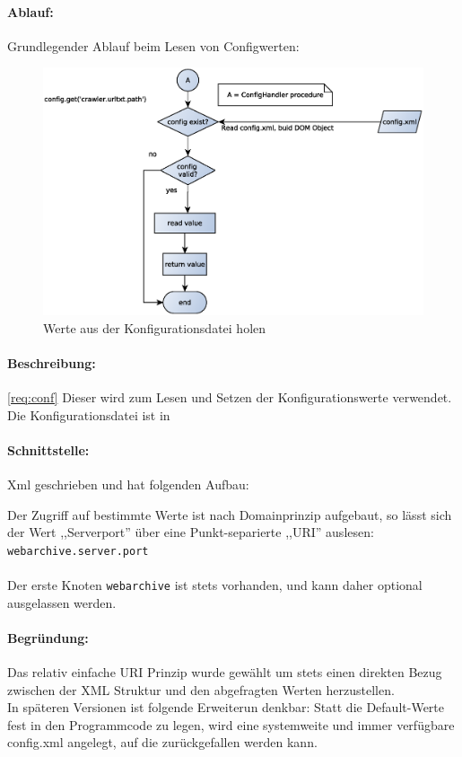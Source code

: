 \paragraph{Ablauf:}
\label{par:ablauf_}
Grundlegender Ablauf beim Lesen von Configwerten:
\begin{figure}[h]
	\centering
	\label{dia:design:backend:overview}
	\includegraphics[width=\textwidth]{design/backend/gfx/getting_value.eps}
	\caption{Werte aus der Konfigurationsdatei holen}
\end{figure}

\paragraph{Beschreibung:}
\ref{req:conf}
\label{par:beschreibung_}
Dieser wird zum Lesen und Setzen der Konfigurationswerte verwendet. Die Konfigurationsdatei ist in 
\paragraph{Schnittstelle:}
\label{par:schnittstelle_}
Xml geschrieben und hat folgenden Aufbau:
    
Der Zugriff auf bestimmte Werte ist nach Domainprinzip aufgebaut, so
lässt sich der Wert ,,Serverport'' über eine Punkt-separierte ,,URI'' auslesen: \texttt{webarchive.server.port} 
\\ \\
Der erste Knoten \texttt{webarchive} ist stets vorhanden, und kann daher optional ausgelassen werden.

\paragraph{Begründung:}
\label{par:begr_ndung}
Das relativ einfache URI Prinzip wurde gewählt um stets einen direkten
Bezug zwischen der XML Struktur und den abgefragten Werten herzustellen.
\\
In späteren Versionen ist folgende Erweiterun denkbar: Statt die
Default-Werte fest in den Programmcode zu legen, wird eine systemweite
und immer verfügbare config.xml angelegt, auf die zurückgefallen werden
kann.

